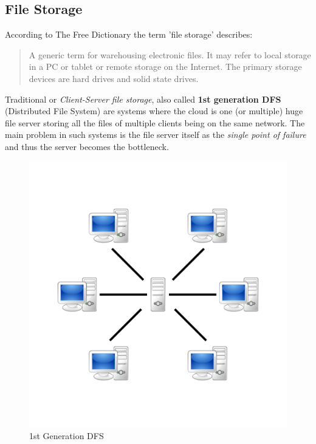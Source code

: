 \subsection{File Storage}
According to The Free Dictionary\cite{thefreedictionary} the term 'file storage' describes:
\begin{quote}
A generic term for warehousing electronic files. It may refer to local storage in a PC or tablet or remote storage on the Internet. The primary storage devices are hard drives and solid state drives.
\end{quote}

Traditional or \textit{Client-Server file storage}, also called \textbf{1st generation DFS} (Distributed File System) are systems where the cloud is one (or multiple) huge file server storing all the files of multiple clients being on the same network. The main problem in such systems is the file server itself as the \textit{single point of failure} and thus the server becomes the bottleneck.

	\begin{figure}[H]
		\begin{center}
		\includegraphics[scale=0.2]{Talk5/1st_gen_dfs.PNG}
		\end{center}
		\caption{1st Generation DFS \cite{wikimedia:p2p}}
		\label{1st_gen_dfs}
	\end{figure}

